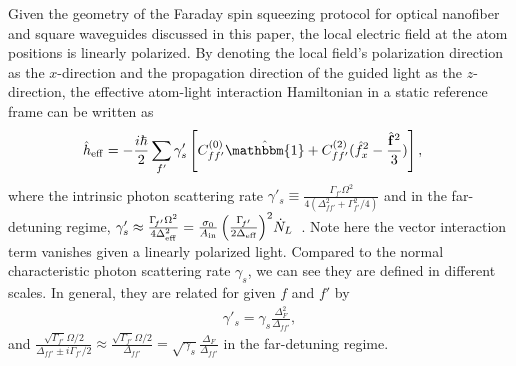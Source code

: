 \documentclass[aps,pra,twocolumn,superscriptaddress]{revtex4-1} %
\newcommand{\Ain}{A_{\rm in}}
\begin{document}
\begin{appendix}
Given the geometry of the Faraday spin squeezing protocol for optical nanofiber and square waveguides discussed in this paper, the local electric field at the atom positions is linearly polarized.
By denoting the local field's polarization direction as the $ x$-direction and the propagation direction of the guided light as the $ z $-direction, the effective atom-light interaction Hamiltonian in a static reference frame can be written as
\begin{align}
\hat{h}_{\rm eff} &= -\frac{i\hbar}{2}\sum_{f'} \gamma'_s \left[C_{ff'}^{(0)}\hat{\mathbbm{1}}+C_{ff'}^{(2)}(\hat{f}_{x}^2-\frac{\hat{\mathbf{f}}^2}{3} ) \right],
\end{align}
where the intrinsic photon scattering rate $ \gamma'_s\equiv \frac{\Gamma_{f'}\Omega^2}{4(\Delta_{f\!f'}^2+\Gamma_{f'}^2/4 )}$ and in the far-detuning regime, $\gamma'_s \approx \frac{\Gamma\!_{f'}\Omega^2}{4\Delta_{\rm eff}^2}=\frac{\sigma_0}{\Ain}\left(\frac{\Gamma\!_{f'}}{2\Delta_{\rm eff}} \right)^2\!\dot{N}_L $~\cite{Deutsch2010a}. Note here the vector interaction term vanishes given a linearly polarized light.
Compared to the normal characteristic photon scattering rate $ \gamma_s $, we can see they are defined in different scales.
In general, they are related for given $ f $ and $ f' $ by
\begin{align}
\gamma'_s=\gamma_s \frac{\Delta_F^2}{\Delta_{f\!f'}},
\end{align}
and $ \frac{\sqrt{\Gamma\!_{f'}}\Omega/2}{\Delta_{f\!f'}\pm i\Gamma\!_{f'}/2}\approx \frac{\sqrt{\Gamma\!_{f'}}\Omega/2}{\Delta_{f\!f'}}=\sqrt{\gamma_s}\frac{\Delta_F}{\Delta_{f\!f'}} $ in the far-detuning regime.


\end{appendix}
\end{document}
